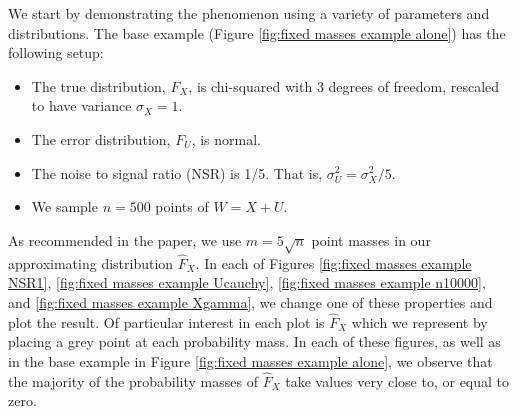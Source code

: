 	We start by demonstrating the phenomenon using a variety of parameters and distributions. The base example (Figure \ref{fig:fixed masses example alone}) has the following setup:

	\begin{itemize}
		\item The true distribution, $F_X$, is chi-squared with 3 degrees of freedom, rescaled to have variance $\sigma_X = 1$.
		\item The error distribution, $F_U$, is normal.
		\item The noise to signal ratio (NSR) is 1/5. That is, $\sigma_U^2 = \sigma_X^2 / 5$.
		\item We sample $n = 500$ points of $W = X+U$.
	\end{itemize}

	As recommended in the paper, we use $m = 5\sqrt{n}$ point masses in our approximating distribution $\hat{F}_X$. In each of Figures \ref{fig:fixed masses example NSR1}, \ref{fig:fixed masses example Ucauchy}, \ref{fig:fixed masses example n10000}, and \ref{fig:fixed masses example Xgamma}, we change one of these properties and plot the result. Of particular interest in each plot is $\hat{F}_X$ which we represent by placing a grey point at each probability mass. In each of these figures, as well as in the base example in Figure \ref{fig:fixed masses example alone}, we observe that the majority of the probability masses of $\hat{F}_X$ take values very close to, or equal to zero.



